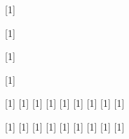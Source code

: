 [1]{} %

[1]{} %

[1]{} %

[1]{} %


%
%
\DeclareMathOperator*{\@macros@distribution@normal@name}{\textrm{N}}
\DeclareMathOperator*{\@macros@distribution@uniform@name}{\textrm{Unif}}
\DeclareMathOperator*{\@macros@distribution@exponential@name}{\textrm{Expo}}
\DeclareMathOperator*{\@macros@distribution@gamma@name}{\textrm{Gamma}}
\DeclareMathOperator*{\@macros@distribution@beta@name}{\textrm{Beta}}
\DeclareMathOperator*{\@macros@distribution@chisquare@name}{\chi^2}
\DeclareMathOperator*{\@macros@distribution@student@name}{\textrm{Stu}}
\DeclareMathOperator*{\@macros@distribution@weibull@name}{\textrm{Wbl}}
\DeclareMathOperator*{\@macros@distribution@multinomial@name}{\textrm{Mult}}

[1]{} %
[1]{} %
[1]{} %
[1]{} %
[1]{} %
[1]{} %
[1]{} %
[1]{} %
[1]{} %

[1]{} %
[1]{} %
[1]{} %
[1]{} %
[1]{} %
[1]{} %
[1]{} %
[1]{} %
[1]{} %

